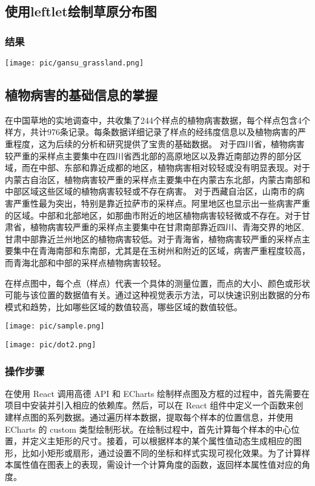 \documentclass{article}
\begin{document}
	\subsection{使用leftlet绘制草原分布图}
	
	
				\subsubsection{结果}


\texttt{[image: pic/gansu\_grassland.png]} %
\subsection{植物病害的基础信息的掌握}
在中国草地的实地调查中，共收集了244个样点的植物病害数据，每个样点包含4个样方，共计976条记录。每条数据详细记录了样点的经纬度信息以及植物病害的严重程度，这为后续的分析和研究提供了宝贵的基础数据。
对于四川省，植物病害较严重的采样点主要集中在四川省西北部的高原地区以及靠近南部边界的部分区域，而在中部、东部和靠近成都的地区，植物病害相对较轻或没有明显表现。对于内蒙古自治区，植物病害较严重的采样点主要集中在内蒙古东北部，内蒙古南部和中部区域这些区域的植物病害较轻或不存在病害。
对于西藏自治区，山南市的病害严重性最为突出，特别是靠近拉萨市的采样点。阿里地区也显示出一些病害严重的区域。中部和北部地区，如那曲市附近的地区植物病害较轻微或不存在。对于甘肃省，植物病害较严重的采样点主要集中在甘肃南部靠近四川、青海交界的地区,甘肃中部靠近兰州地区的植物病害较低。对于青海省，植物病害较严重的采样点主要集中在青海南部和东南部，尤其是在玉树州和附近的区域，病害严重程度较高，而青海北部和中部的采样点植物病害较轻。

在样点图中，每个点（样点）代表一个具体的测量位置，而点的大小、颜色或形状可能与该位置的数据值有关。通过这种视觉表示方法，可以快速识别出数据的分布模式和趋势，比如哪些区域的数值较高，哪些区域的数值较低。
\par
\texttt{[image: pic/sample.png]} %
\par
\texttt{[image: pic/dot2.png]} %
\subsubsection{操作步骤}

在使用 React 调用高德 API 和 ECharts 绘制样点图及方框的过程中，首先需要在项目中安装并引入相应的依赖库。然后，可以在 React 组件中定义一个函数来创建样点图的系列数据。通过遍历样本数据，提取每个样本的位置信息，并使用 ECharts 的 custom 类型绘制形状。在绘制过程中，首先计算每个样本的中心位置，并定义主矩形的尺寸。接着，可以根据样本的某个属性值动态生成相应的图形，比如小矩形或扇形，通过设置不同的坐标和样式实现可视化效果。为了计算样本属性值在图表上的表现，需设计一个计算角度的函数，返回样本属性值对应的角度。
\end{document}
